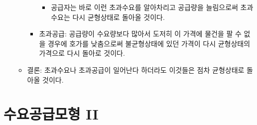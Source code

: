 \documentclass{report}
\begin{document}
\begin{itemize}
\begin{itemize}
\begin{itemize}
\begin{itemize}
\begin{itemize}
                \end{itemize}
                \item 공급자는 바로 이런 초과수요를 알아차리고 공급량을 늘림으로써 초과수요는 다시 균형상태로 돌아올 것이다.
            \end{itemize}
            \item 초과공급: 공급량이 수요량보다 많아서 도저히 이 가격에 물건을 팔 수 없을 경우에 호가를 낮춤으로써 불균형상태에 있던 가격이 다시 균형상태의 가격으로 다시 돌아로 것이다.
        \end{itemize}
        \item 결론: 초과수요나 초과공급이 일어난다 하더라도 이것들은 점차 균형상태로 돌아올 것이다.
    \end{itemize}
\end{itemize}
\chapter{수요공급모형 II}
\end{document}
